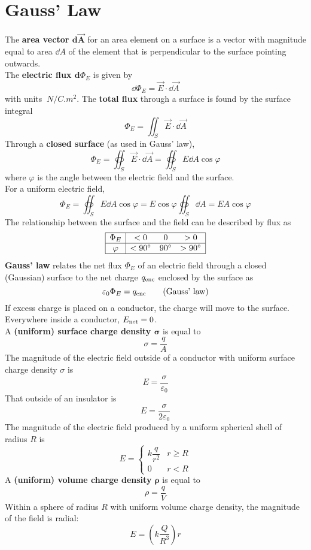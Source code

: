 \documentclass[./Electricity and Magnetism.tex]{subfiles}
\begin{document}
	\section{Gauss' Law}
		The \textbf{area vector \(\bm{\text{d}{\vec{A}}}\)} for an area element on a surface is a vector with magnitude equal to area \(\dd{A}\) of the element that is perpendicular to the surface pointing outwards. \\
		The \textbf{electric flux \({\bm{\text{d}}{\Phi_E}}\)} is given by
			\[\dd{\Phi_E} = \vec{E} \cdot \dd{\vec{A}} \tag{electric flux}\]
			with units \(\SI{}{N/C.m^2}\).
			The \textbf{total flux} through a surface is found by the surface integral
				\[\Phi_E = \iint_S \vec{E} \cdot \dd{\vec{A}} \tag{total flux}\]
			Through a \textbf{closed surface} (as used in Gauss' law),
				\[\Phi_E = \oiint_S \vec{E} \cdot \dd{\vec{A}} = \oiint_S E\dd{A}\cos\varphi \tag{net flux}\]
				where \(\varphi\) is the angle between the electric field and the surface. \\
				For a uniform electric field,
				\[\Phi_E = \oiint_S E \dd{A} \cos\varphi = E\cos\varphi\oiint_S \dd{A} = EA\cos\varphi \]
			The relationship between the surface and the field can be described by flux as
			\[
				\begin{array}{|c|ccc|}\hline
					\Phi_E & < 0 & 0 & > 0 \\\hline
					\varphi & < 90^\circ & 90^\circ & > 90^\circ \\\hline
				\end{array}
			\]
		\textbf{Gauss' law} relates the net flux \(\Phi_E\) of an electric field through a closed (Gaussian) surface to the net charge \(q_{\text{enc}}\) enclosed by the surface as
			\[\varepsilon_0\Phi_E = q_{\text{enc}} \tag{Gauss' law}\]
		If excess charge is placed on a conductor, the charge will move to the surface. \\
		Everywhere inside a conductor, \(E_{\text{net}} = 0\). \\	
		A \textbf{(uniform) surface charge density \(\bm{\sigma}\)} is equal to
			\[\sigma = \frac{q}{A} \tag{uniform surface charge density}\]
		The magnitude of the electric field outside of a conductor with uniform surface charge density \(\sigma\) is
			\[E = \frac{\sigma}{\varepsilon_0} \tag{conducting surface}\]
			That outside of an insulator is
			\[E = \frac{\sigma}{2\varepsilon_0} \tag{insulator}\]
		The magnitude of the electric field produced by a uniform spherical shell of radius \(R\) is
			\[
				E = \begin{cases}
 					k\dfrac{q}{r^2} & r \ge R \\
 					0 & r < R
 				\end{cases}
			\]
		A \textbf{(uniform) volume charge density \(\bm{\rho}\)} is equal to
			\[\rho = \frac{q}{V} \tag{uniform volume charge density}\]
		Within a sphere of radius \(R\) with uniform volume charge density, the magnitude of the field is radial:
			\[E = \left(k\frac{Q}{R^3}\right)r \tag{uniform charge, field at \(r \le R\)}\]
		
\end{document}

